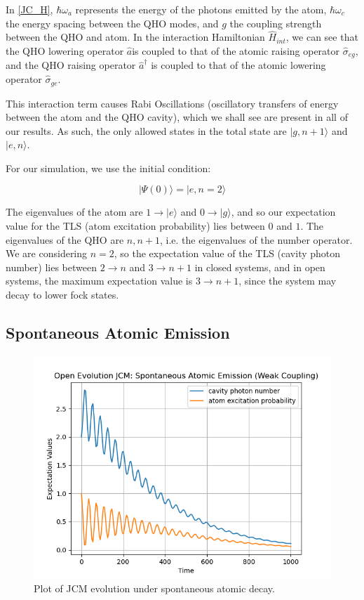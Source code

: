 \documentclass[12pt]{article}
\begin{document}
In \eqref{JC_H}, $\hbar\omega_a$ represents the energy of the photons emitted by the atom, $\hbar\omega_c$ the energy spacing between the QHO modes, and $g$ the coupling strength between the QHO and atom. In the interaction Hamiltonian $\hat{H}_{int}$, we can see that the QHO lowering operator $\hat{a}$is coupled to that of the atomic raising operator $\hat{\sigma}_{eg}$, and the QHO raising operator $\hat{a}^{\dagger}$ is coupled to that of the atomic lowering operator $\hat{\sigma}_{ge}$. 

This interaction term causes Rabi Oscillations (oscillatory transfers of energy between the atom and the QHO cavity), which we shall see are present in all of our results. As such, the only allowed states in the total state are $|g,n+1\rangle$ and $|e,n\rangle$.

For our simulation, we use the initial condition:

\begin{equation}
    |\Psi(0)\rangle = |e,n=2\rangle \label{init_e}
\end{equation}

The eigenvalues of the atom are $1 \rightarrow |e\rangle$ and $0 \rightarrow |g\rangle$, and so our expectation value for the TLS (atom excitation probability) lies between $0$ and $1$. The eigenvalues of the QHO are $n, n+1$, i.e. the eigenvalues of the number operator. We are considering $n=2$, so the expectation value of the TLS (cavity photon number) lies between $2 \rightarrow n$ and $3 \rightarrow n+1$ in closed systems, and in open systems, the maximum expectation value is $3 \rightarrow n+1$, since the system may decay to lower fock states.

\subsection{Spontaneous Atomic Emission}

\begin{figure}[h]
    \centering
    \includegraphics[width=\linewidth]{Research Project/Code/results/JCM/OQS_TLS_Decay.png}
    \caption{Plot of JCM evolution under spontaneous atomic decay.}
    \label{JCM_OQS_TLS}
\end{figure}
\end{document}
